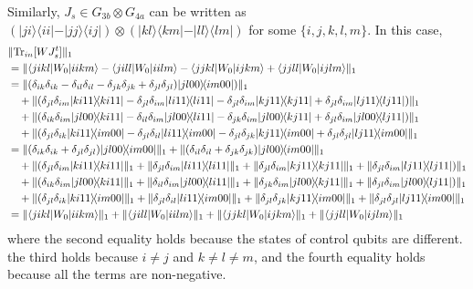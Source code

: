 \documentclass[a4paper,twocolumn,accepted=2022-10-23]{quantumarticle}
\newcommand{\bra}[1]{\langle {#1} \vert}
\newcommand{\ket}[1]{\vert {#1} \rangle}
\newcommand{\ketbra}[2]{\vert {#1} \rangle\!\langle {#2} \vert}
\newcommand{\Tr}[0]{{\mathrm{Tr}}}
\theoremstyle{definition}
\begin{document}
Similarly, $J_s \in G_{3b} \otimes G_{4a}$ can be written as
$(\ketbra{ji}{ii} - \ketbra{jj}{ij}) \otimes (\ketbra{kl}{km} - \ketbra{ll}{lm} )$ for some $\{i,j,k,l,m\}$.
In this case,
\begin{align}
&\| \Tr_{in} [W J_s^t] \|_1 \notag \\
&=\| \bra{jikl} {W_0} \ket{iikm} - \bra{jill} {W_0} \ket{iilm} - \bra{jjkl} {W_0} \ket{ijkm} + \bra{jjll} {W_0} \ket{ijlm} \|_1 \\
%
&= \| (\delta_{ik}\delta_{ik} - \delta_{il}\delta_{il} -\delta_{jk}\delta_{jk}  + \delta_{jl}\delta_{jl}) \ketbra{jl00}{im00}) \|_1 \notag\\
&\quad + \| (\delta_{jl}\delta_{im} \ketbra{ki11}{ki11} - \delta_{jl}\delta_{im} \ketbra{li11}{li11}
-\delta_{jl}\delta_{im} \ketbra{kj11}{kj11} + \delta_{jl}\delta_{im} \ketbra{lj11}{lj11}) \|_1 \notag\\
&\quad + \| (\delta_{ik}\delta_{im} \ketbra{jl00}{ki11} - \delta_{il}\delta_{im} \ketbra{jl00}{li11}
-\delta_{jk}\delta_{im} \ketbra{jl00}{kj11} + \delta_{jl}\delta_{im} \ketbra{jl00}{lj11} ) \|_1 \notag\\
&\quad + \| (\delta_{jl}\delta_{ik} \ketbra{ki11}{im00} - \delta_{jl}\delta_{il} \ketbra{li11}{im00}
-\delta_{jl}\delta_{jk} \ketbra{kj11}{im00} + \delta_{jl}\delta_{jl} \ketbra{lj11}{im00} \|_1 \\
%
&= \| (\delta_{ik}\delta_{ik} + \delta_{jl}\delta_{jl}) \ketbra{jl00}{im00} \|_1 + \| (\delta_{il}\delta_{il} +\delta_{jk}\delta_{jk}  ) \ketbra{jl00}{im00} \|_1 \notag\\
&\quad + \| (\delta_{jl}\delta_{im} \ketbra{ki11}{ki11} \|_1 + \| \delta_{jl}\delta_{im} \ketbra{li11}{li11} \|_1
+ \| \delta_{jl}\delta_{im} \ketbra{kj11}{kj11} \|_1 + \| \delta_{jl}\delta_{im} \ketbra{lj11}{lj11}) \|_1 \notag\\
&\quad + \| (\delta_{ik}\delta_{im} \ketbra{jl00}{ki11} \|_1 + \| \delta_{il}\delta_{im} \ketbra{jl00}{li11} \|_1
+ \| \delta_{jk}\delta_{im} \ketbra{jl00}{kj11} \|_1 + \| \delta_{jl}\delta_{im} \ketbra{jl00}{lj11} ) \|_1 \notag\\
&\quad + \| (\delta_{jl}\delta_{ik} \ketbra{ki11}{im00} \|_1 + \| \delta_{jl}\delta_{il} \ketbra{li11}{im00} \|_1
+ \| \delta_{jl}\delta_{jk} \ketbra{kj11}{im00} \|_1 + \| \delta_{jl}\delta_{jl} \ketbra{lj11}{im00} \|_1 \\
%
&=\| \bra{jikl} {W_0} \ket{iikm} \|_1 + \| \bra{jill} {W_0} \ket{iilm} \|_1 + \| \bra{jjkl} {W_0} \ket{ijkm} \|_1 + \| \bra{jjll} {W_0} \ket{ijlm} \|_1
\end{align}
where the second equality holds because the states of control qubits are different.
the third holds because $i \neq j$ and $k \neq l \neq m$,
and the fourth equality holds because all the terms are non-negative.
\end{document}
